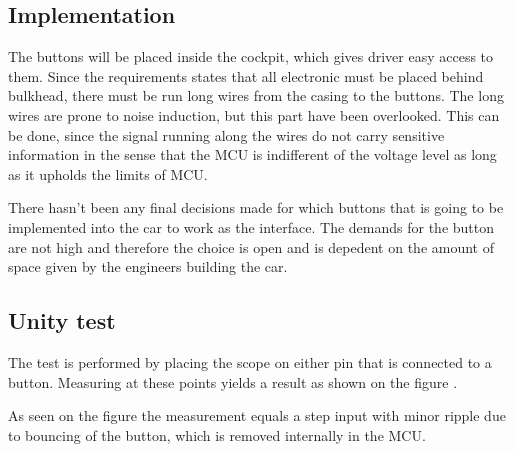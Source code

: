 \newpage
\subsection{Implementation}
The buttons will be placed inside the cockpit, which gives driver easy access to them. Since the requirements states that all electronic must be placed behind bulkhead, there must be run long wires from the casing to the buttons. The long wires are prone to noise induction, but this part have been overlooked. This can be done, since the signal running along the wires do not carry sensitive information in the sense that the MCU is indifferent of the voltage level as long as it upholds the limits of MCU.

There hasn't been any final decisions made for which buttons that is going to be implemented into the car to work as the interface. The demands for the button are not high and therefore the choice is open and is depedent on the amount of space given by the engineers building the car.

\subsection{Unity test}
The test is performed by placing the scope on either pin that is connected to a button. Measuring at these points yields a result as shown on the figure .

As seen on the figure  the measurement equals a step input with minor ripple due to bouncing of the button, which is removed internally in the MCU. 